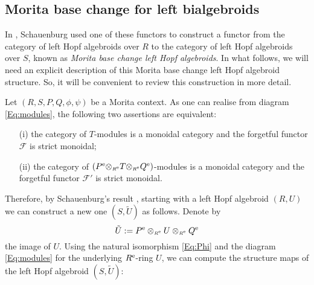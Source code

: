 \documentclass[reqno, a4paper, 10pt]{amsart}
\numberwithin{equation}{section}
\theoremstyle{plain}
\theoremstyle{definition}
\theoremstyle{remark}
\begin{document}
\subsection{Morita base change for left bialgebroids}
\label{subsect:Morita}
In \cite{Schau:MBCIQG}, Schauenburg used one of these functors to construct a functor 
from the category of left Hopf algebroids over $R$ to the category of left Hopf algebroids over $S$, known as 
\emph{Morita base change left Hopf algebroids}. 
In what follows, 
we will need an explicit description of this Morita base change left Hopf algebroid structure. So, it will be convenient to review this construction in more detail.

Let $(R,S,P,Q,\phi,\psi)$ be a Morita context. As one can realise from diagram \eqref{Eq:modules},  the following two assertions are equivalent: 
\begin{enumerate}
\item[(i)] the category of $T$-modules  is a monoidal category and the forgetful functor  ${\mathscr{{F}}}$ is strict monoidal; 
\item[(ii)] the category of $({{P^{\rm e}}}{\otimes_{\scriptscriptstyle{{\scriptscriptstyle{{R^{\rm e}}}}}}}T{\otimes_{\scriptscriptstyle{{\scriptscriptstyle{{R^{\rm e}}}}}}}{{Q^{\rm e}}})$-modules  is a monoidal category and the forgetful functor  ${\mathscr{{F}}}'$ is strict monoidal.
\end{enumerate}
Therefore, by Schauenburg's result \cite[Theorem 5.1]{Schau:BONCRAASTFHB},  starting with a left Hopf algebroid $(R, U)$ we can construct a new one $(S, \tilde{U})$ as follows. Denote by 
$$
\tilde{U} := {{P^{\rm e}}} \otimes_{{\scriptscriptstyle{{R^{\rm e}}}}} U \otimes_{{\scriptscriptstyle{{R^{\rm e}}}}} {{Q^{\rm e}}}
$$
the image of $U$. Using the natural isomorphism \eqref{Eq:Phi} and the diagram \eqref{Eq:modules} for the underlying ${{R^{\rm e}}}$-ring $U$, we can compute the structure maps of the left Hopf algebroid $(S,\tilde{U})$:
\end{document}
